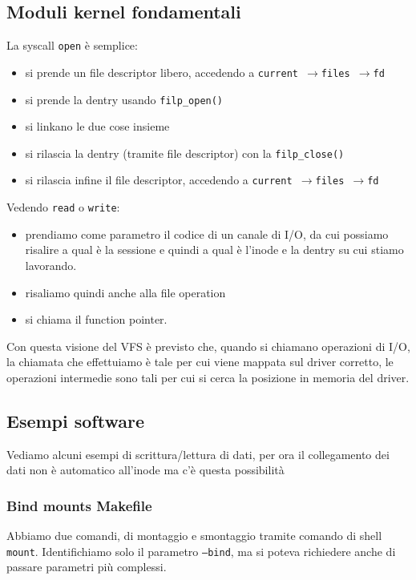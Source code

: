 \documentclass[12pt, oneside]{extbook}
\begin{document}
\subsection{Moduli kernel fondamentali}
La syscall \texttt{open} è semplice:
\begin{itemize}
	\item si prende un file descriptor libero, accedendo a \texttt{current $\rightarrow$files $\rightarrow$fd}
	\item si prende la dentry usando \texttt{filp\_open()}
	\item si linkano le due cose insieme
	\item si rilascia la dentry (tramite file descriptor) con la \texttt{filp\_close()}
	\item si rilascia infine il file descriptor, accedendo a \texttt{current $\rightarrow$files $\rightarrow$fd}
\end{itemize}
Vedendo \texttt{read} o \texttt{write}:
\begin{itemize}
	\item prendiamo come parametro il codice di un canale di I/O, da cui possiamo risalire a qual è la sessione e quindi a qual è l'inode e la dentry su cui stiamo lavorando. 
	\item risaliamo quindi anche alla file operation
	\item si chiama il function pointer.
\end{itemize}
Con questa visione del VFS è previsto che, quando si chiamano operazioni di I/O, la chiamata che effettuiamo è tale per cui viene mappata sul driver corretto, le operazioni intermedie sono tali per cui si cerca la posizione in memoria del driver.
\subsection*{Esempi software}
Vediamo alcuni esempi di scrittura/lettura di dati, per ora il collegamento dei dati non è automatico all'inode ma c'è questa possibilità
\subsubsection*{Bind mounts Makefile}
Abbiamo due comandi, di montaggio e smontaggio tramite comando di shell \texttt{mount}. Identifichiamo solo il parametro \texttt{--bind}, ma si poteva richiedere anche di passare parametri più complessi.
\end{document}
